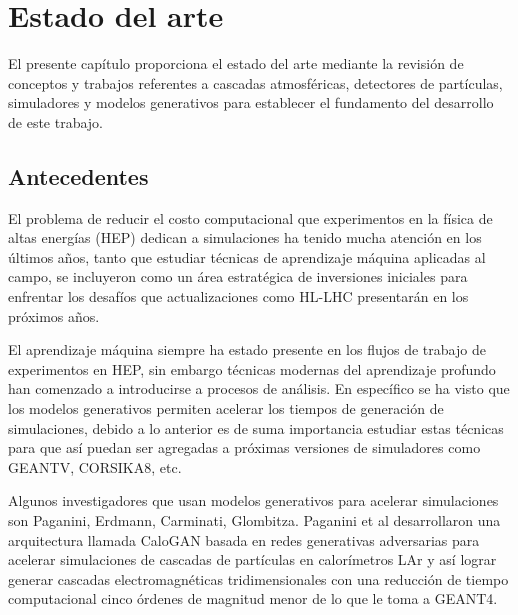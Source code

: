 
\chapter{Estado del arte} %

\label{Chapter2} %

El presente capítulo proporciona el estado del arte mediante la revisión de conceptos y trabajos referentes a cascadas atmosféricas, detectores de partículas, simuladores y modelos generativos para establecer el fundamento del desarrollo de este trabajo. 

\section{Antecedentes}

El problema de reducir el costo computacional que experimentos en la física de altas energías (HEP) dedican a simulaciones ha tenido mucha atención en los últimos años, tanto que estudiar técnicas de aprendizaje máquina aplicadas al campo, se incluyeron como un área estratégica de inversiones iniciales para enfrentar los desafíos que actualizaciones como HL-LHC presentarán en los próximos años. 

El aprendizaje máquina siempre ha estado presente en los flujos de trabajo de experimentos en HEP, sin embargo técnicas modernas del aprendizaje profundo han comenzado a introducirse a procesos de análisis. En específico se ha visto que los modelos generativos permiten acelerar los tiempos de generación de simulaciones, debido a lo anterior es de suma importancia estudiar estas técnicas para que así puedan ser agregadas a próximas versiones de simuladores como GEANTV, CORSIKA8, etc.

Algunos investigadores que usan modelos generativos para acelerar simulaciones son Paganini, Erdmann, Carminati, Glombitza.
Paganini et al desarrollaron una arquitectura llamada CaloGAN basada en redes generativas adversarias para acelerar simulaciones de cascadas de partículas en calorímetros LAr y así lograr generar cascadas electromagnéticas tridimensionales con una reducción de tiempo computacional cinco órdenes de magnitud menor de lo que le toma a GEANT4.

